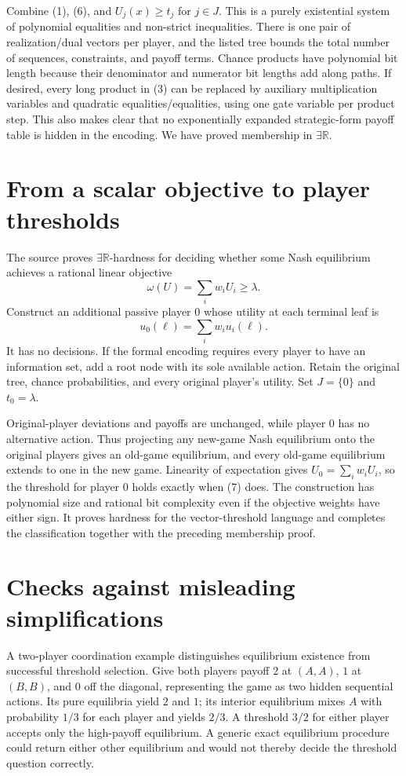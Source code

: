 \documentclass[11pt]{article}
\begin{document}
Combine (1), (6), and $U_j(x)\geq t_j$ for $j\in J$. This is a purely
existential system of polynomial equalities and non-strict inequalities.
There is one pair of realization/dual vectors per player, and the listed
tree bounds the total number of sequences, constraints, and payoff terms.
Chance products have polynomial bit length because their denominator and
numerator bit lengths add along paths. If desired, every long product in
(3) can be replaced by auxiliary multiplication variables and quadratic
equalities/equalities, using one gate variable per product step. This
also makes clear that no exponentially expanded strategic-form payoff
table is hidden in the encoding. We have proved membership in
$\exists\mathbb R$.

\section*{From a scalar objective to player thresholds}
The source proves $\exists\mathbb R$-hardness for deciding whether some
Nash equilibrium achieves a rational linear objective
\[
                    \omega(U)=\sum_i w_iU_i\geq\lambda.          \tag{7}
\]
Construct an additional passive player $0$ whose utility at each terminal
leaf is
\[
                              u_0(\ell)=\sum_iw_iu_i(\ell).
\]
It has no decisions. If the formal encoding requires every player to
have an information set, add a root node with its sole available action.
Retain the original tree, chance probabilities, and every original
player's utility. Set $J=\{0\}$ and $t_0=\lambda$.

Original-player deviations and payoffs are unchanged, while player $0$
has no alternative action. Thus projecting any new-game Nash equilibrium
onto the original players gives an old-game equilibrium, and every
old-game equilibrium extends to one in the new game. Linearity of
expectation gives $U_0=\sum_iw_iU_i$, so the threshold for player $0$
holds exactly when (7) does. The construction has polynomial size and
rational bit complexity even if the objective weights have either sign.
It proves hardness for the vector-threshold language and completes the
classification together with the preceding membership proof.

\section*{Checks against misleading simplifications}
A two-player coordination example distinguishes equilibrium existence
from successful threshold selection. Give both players payoff $2$ at
$(A,A)$, $1$ at $(B,B)$, and $0$ off the diagonal, representing the game
as two hidden sequential actions. Its pure equilibria yield $2$ and $1$;
its interior equilibrium mixes $A$ with probability $1/3$ for each player
and yields $2/3$. A threshold $3/2$ for either player accepts only the
high-payoff equilibrium. A generic exact equilibrium procedure could
return either other equilibrium and would not thereby decide the
threshold question correctly.
\end{document}
